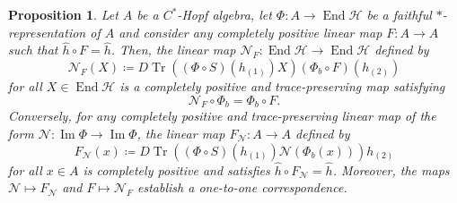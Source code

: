 \documentclass[a4paper,10pt]{amsart}
\newcommand{\Noisy}{\mathcal{N}}
\newtheorem{proposition}[theorem]{Proposition}
\theoremstyle{definition}
\begin{document}
\begin{proposition}
\label{prop:NF}
	Let $A$ be a $C^*$-Hopf algebra, let $\Phi : A \to \operatorname{End}\mathscr{H}$ be a faithful $*$-re\-pre\-sen\-ta\-tion of $A$ and consider any completely positive linear map $F:A\to A$ such that $\hat{h}\circ F = \hat{h}$.
    Then, the linear map $\Noisy_F:\operatorname{End}\mathscr{H}\to\operatorname{End}\mathscr{H}$ defined by
	\begin{equation}\label{eq:DefinitionNF}
		\Noisy_F(X)
            \coloneqq
            D \operatorname{Tr}((\Phi\circ S)(h_{(1)})X) (\Phi_b\circ F)(h_{(2)})
	\end{equation}
    for all $X\in\operatorname{End}\mathscr{H}$
	is a completely positive and trace-preserving map satisfying
	\begin{equation}\label{eq:PropertyNF}
		\Noisy_F\circ \Phi_b
        =
        \Phi_b\circ F.
	\end{equation}
	Conversely, for any completely positive and trace-preserving linear map of the form $\Noisy:\operatorname{Im}\Phi\to\operatorname{Im}\Phi$, the linear map $F_\Noisy:A\to A$ defined by
	\begin{equation}\label{eq:NtoF}
		F_\Noisy(x) \coloneqq D \operatorname{Tr}((\Phi\circ S)(h_{(1)}) \Noisy(\Phi_b(x)))  h_{(2)}
	\end{equation}
	for all $x\in A$ is completely positive and satisfies $\hat{h}\circ F_{\Noisy} = \hat{h}$. Moreover, the maps $\Noisy\mapsto F_{\Noisy}$ and $F\mapsto \Noisy_F$ establish a one-to-one correspondence.
\end{proposition}
\end{document}
